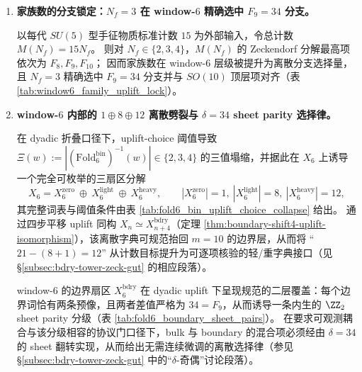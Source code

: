\begin{enumerate}
  \item \textbf{家族数的分支锁定：\texorpdfstring{$N_f=3$}{Nf=3} 在 window-\(6\) 精确选中 \texorpdfstring{$F_9=34$}{F9=34} 分支。}

  \begin{theorem}[家族数锁定的三分支选择律]
  \label{thm:terminal-family-uplift-lock}
  以每代 \(SU(5)\) 型手征物质标准计数 \(15\) 为外部输入，令总计数 \(M(N_f)=15N_f\)。
  则对 \(N_f\in\{2,3,4\}\)，\(M(N_f)\) 的 Zeckendorf 分解最高项依次为 \(F_8,F_9,F_{10}\)；
  因而家族数在 window-\(6\) 层级被提升为离散分支选择量，且 \(N_f=3\) 精确选中 \(F_9=34\) 分支并与 \(SO(10)\) 顶层项对齐（表 \ref{tab:window6_family_uplift_lock}）。
  \end{theorem}

  \item \textbf{window-\(6\) 内部的 \texorpdfstring{$1\oplus 8\oplus 12$}{1+8+12} 离散劈裂与 \texorpdfstring{$\delta=34$}{δ=34} sheet parity 选择律。}

  \begin{proposition}
  \label{prop:terminal-window6-1-8-12-split}
  在 dyadic 折叠口径下，uplift-choice 阈值导致 \(\Xi(w):=|(\mathrm{Fold}^{\mathrm{bin}}_6)^{-1}(w)|\in\{2,3,4\}\) 的三值塌缩，并据此在 \(X_6\) 上诱导一个完全可枚举的三扇区分解
  \[
  X_6=X_6^{\mathrm{zero}}\ \oplus\ X_6^{\mathrm{light}}\ \oplus\ X_6^{\mathrm{heavy}},
  \qquad
  |X_6^{\mathrm{zero}}|=1,\ |X_6^{\mathrm{light}}|=8,\ |X_6^{\mathrm{heavy}}|=12,
  \]
  其完整词表与阈值条件由表 \ref{tab:fold6_bin_uplift_choice_collapse} 给出。
  通过四步平移 uplift 同构 \(X_n\simeq X_{n+4}^{\mathrm{bdry}}\)（定理 \ref{thm:boundary-shift4-uplift-isomorphism}），该离散字典可规范抬回 \(m=10\) 的边界层，从而将 “\(21-(8+1)=12\)” 从计数目标提升为可逐项核验的轻/重字典接口（见 \S\ref{subsec:bdry-tower-zeck-gut} 的相应段落）。
  \end{proposition}

  \begin{corollary}[\texorpdfstring{$\delta=34$}{δ=34} 的二层覆盖与离散奇偶选择定则]
  \label{cor:terminal-delta-parity-rule}
  window-\(6\) 的边界扇区 \(X_6^{\mathrm{bdry}}\) 在 dyadic uplift 下呈现规范的二层覆盖：每个边界词恰有两条预像，且两者差值严格为 \(34=F_9\)，从而诱导一条内生的 \(\ZZ_2\) sheet parity 分级（表 \ref{tab:fold6_boundary_sheet_pairs}）。
  在要求可观测耦合与该分级相容的协议门口径下，bulk 与 boundary 的混合项必须经由 \(\delta=34\) 的 sheet 翻转实现，从而给出无需连续微调的离散选择律（参见 \S\ref{subsec:bdry-tower-zeck-gut} 中的“\(\delta\)-奇偶”讨论段落）。
  \end{corollary}


\end{enumerate}
